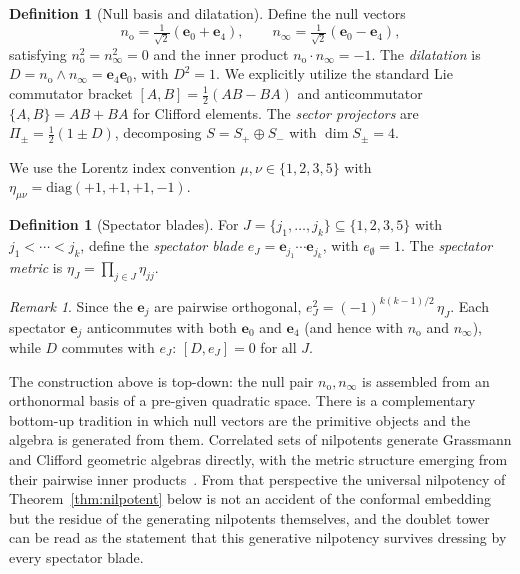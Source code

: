 \documentclass{birkjour}
\theoremstyle{definition}
\newtheorem{defn}[thm]{Definition}
\theoremstyle{remark}
\newtheorem{rem}[thm]{Remark}
\numberwithin{equation}{section}
\newcommand{\e}[1]{\bm{e}_{#1}}
\newcommand{\no}{n_{\mathrm{o}}}
\newcommand{\ninf}{n_{\infty}}
\newenvironment{revblock}{}{}
\begin{document}
\begin{defn}[Null basis and dilatation]\label{def:null}
Define the null vectors
\begin{equation}\label{eq:null}
\no=\tfrac{1}{\sqrt{2}}(\e{0}+\e{4}),
\qquad
\ninf=\tfrac{1}{\sqrt{2}}(\e{0}-\e{4}),
\end{equation}
satisfying $\no^2=\ninf^2=0$ and the inner product $\no\cdot\ninf=-1$.
The \emph{dilatation} is
$D=\no\wedge\ninf=\e{4}\e{0}$, with $D^2=1$. We explicitly utilize the standard Lie commutator bracket $[A,B] = \frac{1}{2}(AB-BA)$ and anticommutator $\{A,B\} = AB+BA$ for Clifford elements.
The \emph{sector projectors} are
$\Pi_\pm=\tfrac12(1\pm D)$, decomposing
$S=S_+\oplus S_-$ with $\dim S_\pm=4$.
\end{defn}

We use the Lorentz index convention
$\mu,\nu\in\{1,2,3,5\}$ with
$\eta_{\mu\nu}=\mathrm{diag}(+1,+1,+1,-1)$.

\begin{defn}[Spectator blades]\label{def:spectator}
For $J=\{j_1,\ldots,j_k\}\subseteq\{1,2,3,5\}$ with
$j_1<\cdots<j_k$, define the \emph{spectator blade}
$e_J=\e{j_1}\cdots\e{j_k}$, with $e_\emptyset=1$.
The \emph{spectator metric} is
$\eta_J=\prod_{j\in J}\eta_{jj}$.
\end{defn}

\begin{rem}\label{rem:spectator-sq}
Since the $\e{j}$ are pairwise orthogonal,
$e_J^2=(-1)^{k(k-1)/2}\,\eta_J$.
Each spectator $\e{j}$ anticommutes with both $\e{0}$
and $\e{4}$ (and hence with $\no$ and $\ninf$), while
$D$ commutes with $e_J$: $[D,e_J]=0$ for all $J$.
\end{rem}

\begin{revblock}
The construction above is top-down: the null pair $\no,\ninf$
is assembled from an orthonormal basis of a pre-given quadratic
space. There is a complementary bottom-up tradition in which
null vectors are the primitive objects and the algebra is
generated from them. Correlated sets of nilpotents generate
Grassmann and Clifford geometric algebras directly, with the
metric structure emerging from their pairwise inner
products~\cite{SobczykCruzPage2026,Sobczyk2023,Sobczyk2023b}.
From that perspective the universal nilpotency of
Theorem~\ref{thm:nilpotent} below is not an accident of the
conformal embedding but the residue of the generating
nilpotents themselves, and the doublet tower can be read as
the statement that this generative nilpotency survives
dressing by every spectator blade.
\end{revblock}
\end{document}
